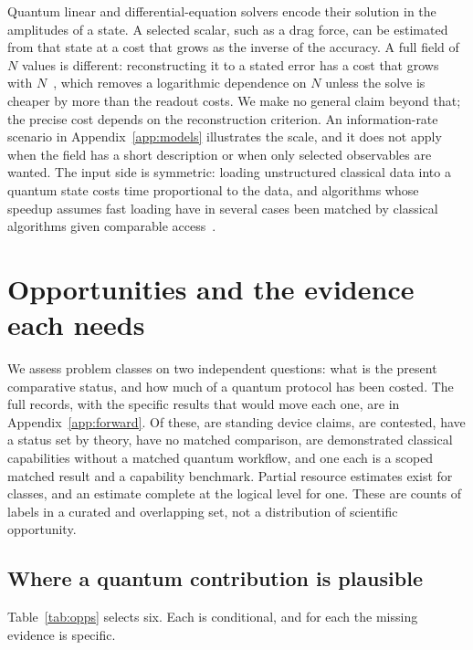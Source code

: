 \documentclass[10pt,a4paper]{article}
\begin{document}
Quantum linear and differential-equation solvers encode their solution in the amplitudes of a state. A selected scalar, such as a drag force, can be estimated from that state at a cost that grows as the inverse of the accuracy. A full field of $N$ values is different: reconstructing it to a stated error has a cost that grows with $N$~\cite{aaronson2015}, which removes a logarithmic dependence on $N$ unless the solve is cheaper by more than the readout costs. We make no general claim beyond that; the precise cost depends on the reconstruction criterion. An information-rate scenario in Appendix~\ref{app:models} illustrates the scale, and it does not apply when the field has a short description or when only selected observables are wanted. The input side is symmetric: loading unstructured classical data into a quantum state costs time proportional to the data, and algorithms whose speedup assumes fast loading have in several cases been matched by classical algorithms given comparable access~\cite{tang2021,tang2023}.
\section{Opportunities and the evidence each needs}
\label{sec:opps}

We assess \nClasses{} problem classes on two independent questions: what is the present comparative status, and how much of a quantum protocol has been costed. The full records, with the specific results that would move each one, are in Appendix~\ref{app:forward}. Of these, \nFstanding{} are standing device claims, \nFcontested{} are contested, \nFtheory{} have a status set by theory, \nFnotcompared{} have no matched comparison, \nFclasscap{} are demonstrated classical capabilities without a matched quantum workflow, and one each is a scoped matched result and a capability benchmark. Partial resource estimates exist for \nMpartial{} classes, and an estimate complete at the logical level for one. These are counts of labels in a curated and overlapping set, not a distribution of scientific opportunity.

\subsection{Where a quantum contribution is plausible}
Table~\ref{tab:opps} selects six. Each is conditional, and for each the missing evidence is specific.
\end{document}

